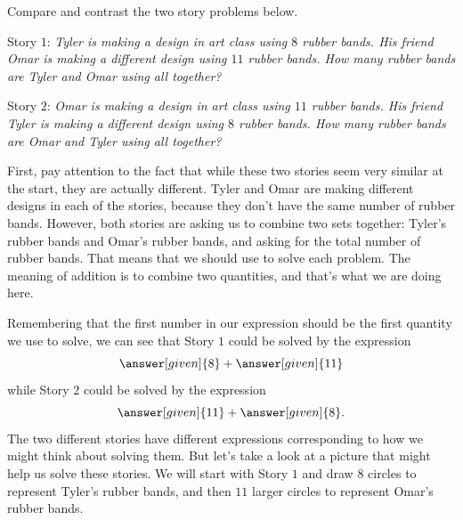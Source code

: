 \documentclass{ximera}
\begin{document}
\begin{example}
Compare and contrast the two story problems below.

Story $1$: \emph{Tyler is making a design in art class using $8$ rubber bands. His friend Omar is making a different design using $11$ rubber bands. How many rubber bands are Tyler and Omar using all together?}

Story $2$: \emph{Omar is making a design in art class using $11$ rubber bands. His friend Tyler is making a different design using $8$ rubber bands. How many rubber bands are Omar and Tyler using all together?}

First, pay attention to the fact that while these two stories seem very similar at the start, they are actually different. Tyler and Omar are making different designs in each of the stories, because they don't have the same number of rubber bands. However, both stories are asking us to combine two sets together: Tyler's rubber bands and Omar's rubber bands, and asking for the total number of rubber bands. That means that we should use  to solve each problem. The meaning of addition is to combine two quantities, and that's what we are doing here. 

Remembering that the first number in our expression should be the first quantity we use to solve, we can see that Story $1$ could be solved by the expression
\[
\answer[given]{8} + \answer[given]{11}
\]
while Story $2$ could be solved by the expression
\[
\answer[given]{11} + \answer[given]{8}.
\]
The two different stories have different expressions corresponding to how we might think about solving them. But let's take a look at a picture that might help us solve these stories. We will start with Story $1$ and draw $8$ circles to represent Tyler's rubber bands, and then $11$ larger circles to represent Omar's rubber bands.


\end{example}
\end{document}
